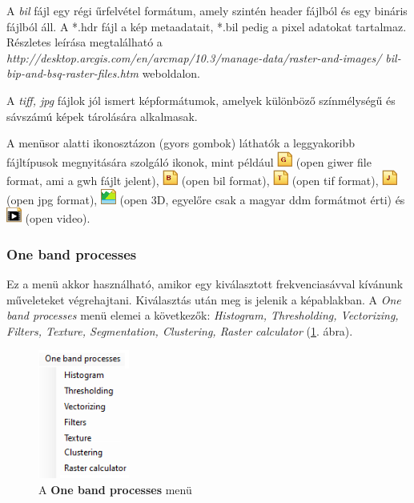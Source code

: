 \documentclass[a4paper,12pt]{article}
\begin{document}
A \textit{bil} fájl egy régi űrfelvétel formátum, amely szintén header fájlból és egy bináris fájlból áll. A *.hdr fájl a kép metaadatait, *.bil pedig a pixel adatokat tartalmaz. Részletes leírása megtalálható a \newline \textit{http://desktop.arcgis.com/en/arcmap/10.3/manage-data/raster-and-images/ bil-bip-and-bsq-raster-files.htm} weboldalon. 

A \textit{tiff, jpg} fájlok jól ismert képformátumok, amelyek különböző színmélységű és sávszámú képek tárolására alkalmasak.

A menüsor alatti ikonosztázon (gyors gombok) láthatók a leggyakoribb fájltípusok megnyitására szolgáló ikonok, mint például \includegraphics[width=0.5cm]{opengiwer.png} (open giwer file format, ami a gwh fájlt jelent), \includegraphics[width=0.5cm]{openbil.png} (open bil format), \includegraphics[width=0.5cm]{opentif.png} (open tif format), \includegraphics[width=0.5cm]{openjpg.png} (open jpg format), \includegraphics[width=0.5cm]{3d.png} (open 3D, egyelőre csak a magyar ddm formátmot érti) és \includegraphics[width=0.5cm]{openvideo.png} (open video).

	
\subsubsection{One band processes}

 
Ez a menü akkor használható, amikor egy kiválasztott frekvenciasávval kívánunk műveleteket végrehajtani. Kiválasztás után meg is jelenik a képablakban. %
 A \textit{One band processes} menü elemei a következők: \textit{Histogram, Thresholding, Vectorizing, Filters, Texture, Segmentation, Clustering, Raster calculator} (\ref{fig:onebandmenu}. ábra).

\begin{figure}
	\centering
	\includegraphics[width=3cm]{onebandmenu.png}
	\caption{A \textbf{One band processes} menü}
	\label{fig:onebandmenu}
\end{figure}
\end{document}

